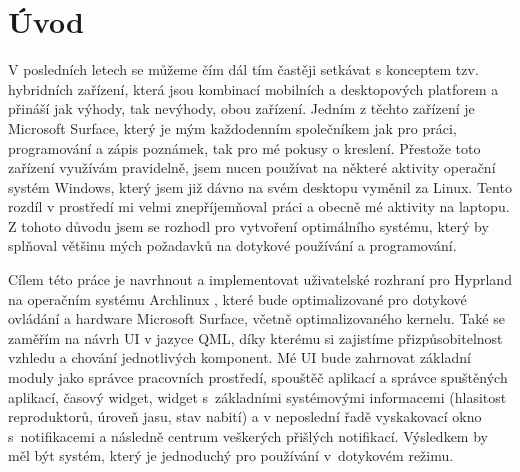 \documentclass[12pt,a4paper]{article}
\begin{document}

\begin{abstract}
Tato práce se zabývá vývojem dotykově orientovaného uživatelského rozhraní pro Arch Linux \autocite{ArchWiki},
umožňujícího ovládání počítače pomocí dotykových gest a stylusu. Cílem projektu bylo vytvořit modulární,
konfigurovatelný systém, který podporuje notifikace a dynamické přepínání pracovních prostředí. 
Projekt je postaven na frameworku QuickShell, ve kterém je navrhnuto veškeré UI tohoto projektu.
QuickShell \autocite{Quickshell} je rozhraní mezi deklarativním jazykem QML a operačním systémem.
Pro správu oken, pracovních prostředí a klávesových zkratek používáme moderní dynamic manager a
compositor Hyprland \autocite{HyprlandWiki2026}.
Výsledkem je uživatelské prostředí, jehož účinnost a vzhled zbytečně nezatěžuje počítač. 
\end{abstract}
\newpage

\setcounter{tocdepth}{2} %
\tableofcontents
\newpage
{}

\section{Úvod}
V posledních letech se můžeme čím dál tím častěji setkávat s konceptem tzv. hybridních zařízení,
která jsou kombinací mobilních a desktopových platforem a přináší jak výhody, tak nevýhody, obou
zařízení. Jedním z těchto zařízení je Microsoft Surface, který je mým každodenním společníkem
jak pro práci, programování a zápis poznámek, tak pro mé pokusy o kreslení. 
Přestože toto zařízení využívám pravidelně, jsem nucen používat na některé aktivity operační
systém Windows, který jsem již dávno na svém desktopu vyměnil za Linux. Tento rozdíl v prostředí
mi velmi znepříjemňoval práci a obecně mé aktivity na laptopu. Z tohoto důvodu jsem se 
rozhodl pro vytvoření optimálního systému, který by splňoval většinu mých požadavků na 
dotykové používání a programování. 

Cílem této práce je navrhnout a implementovat uživatelské rozhraní pro Hyprland \autocite{HyprlandWiki2026}
na operačním systému Archlinux \autocite{ArchWiki}, které bude optimalizované pro dotykové ovládání a
hardware Microsoft Surface, včetně optimalizovaného kernelu. Také se zaměřím na návrh UI v jazyce QML,
díky kterému si zajistíme přizpůsobitelnost vzhledu a chování jednotlivých komponent. Mé UI bude zahrnovat
základní moduly jako správce pracovních prostředí, spouštěč aplikací a správce spuštěných aplikací,
časový widget, widget s~základními systémovými informacemi (hlasitost reproduktorů, úroveň jasu, stav nabití)
a v neposlední řadě vyskakovací okno s~notifikacemi a následně centrum veškerých přišlých notifikací.
Výsledkem by měl být systém, který je jednoduchý pro používání v~dotykovém režimu.
\end{document}
